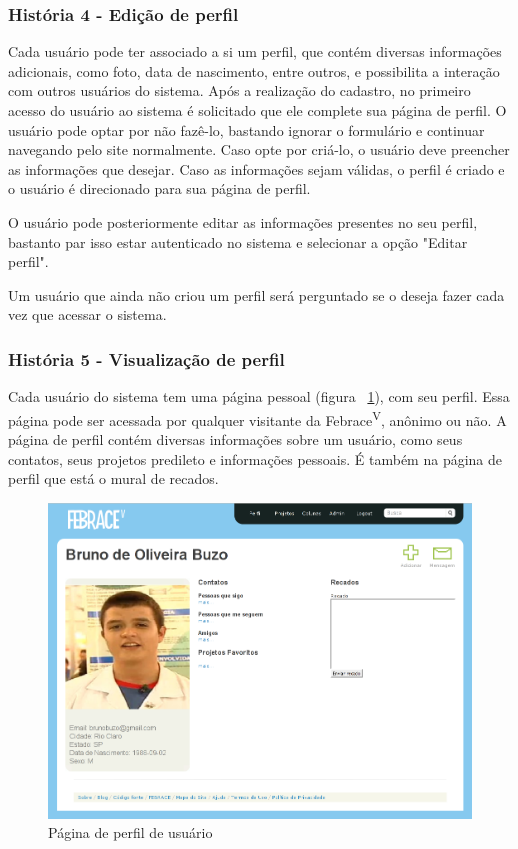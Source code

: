     \subsubsection{História 4 - Edição de perfil}
      Cada usuário pode ter associado a si um perfil, que contém diversas informações adicionais, como foto, data de nascimento, entre outros, e possibilita a interação com outros usuários do sistema. Após a realização do cadastro, no primeiro acesso do usuário ao sistema é solicitado que ele complete sua página de perfil. O usuário pode optar por não fazê-lo, bastando ignorar o formulário e continuar navegando pelo site normalmente. Caso opte por criá-lo, o usuário deve preencher as informações que desejar. Caso as informações sejam válidas, o perfil é criado e o usuário é direcionado para sua página de perfil.

      O usuário pode posteriormente editar as informações presentes no seu perfil, bastanto par isso estar autenticado no sistema e selecionar a opção "Editar perfil".

      Um usuário que ainda não criou um perfil será perguntado se o deseja fazer cada vez que acessar o sistema.

    \subsubsection{História 5 - Visualização de perfil}
      Cada usuário do sistema tem uma página pessoal (figura ~\ref{perfil}), com seu perfil. Essa página pode ser acessada por qualquer visitante da Febrace\textsuperscript{V}, anônimo ou não. A página de perfil contém diversas informações sobre um usuário, como seus contatos, seus projetos predileto e informações pessoais. É também na página de perfil que está o mural de recados.

    \begin{figure}[h]
        \begin{center}
    \includegraphics[width=0.7\linewidth]{arquivos/perfil.png}
        \end{center}
        \caption{Página de perfil de usuário}
        \label{perfil}
    \end{figure}

